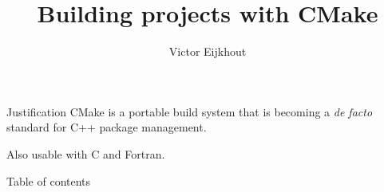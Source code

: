 \documentclass[10pt]{beamer}
\begin{document}

\title[CMake tutorial]{Building projects with CMake}
\author[Eijkhout]{Victor Eijkhout}
\date{\hpcsemester}

\maketitle

\begin{frame}{Justification}
  CMake is a portable build system that is
  becoming a \emph{de facto} standard for C++ package management.

  Also usable with C and Fortran.
\end{frame}

\begin{frame}{Table of contents}
  \tableofcontents
\end{frame}







\end{document}
